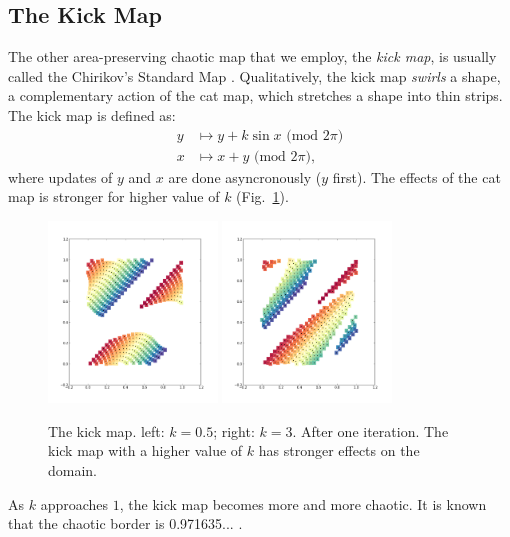 \documentclass[12pt]{reedmcm}
\begin{document}
\subsection{The Kick Map}
The other area-preserving chaotic map that we employ, the \textit{kick map}, is usually called the Chirikov's Standard Map \citep{ott}.
Qualitatively, the kick map \textit{swirls} a shape, a complementary action of the cat map, which stretches a shape into thin strips.
The kick map is defined as:
\begin{align*}
  y &\mapsto y + k \sin x \mbox{ (mod $2\pi$)} \\
  x &\mapsto x + y \mbox{ (mod $2\pi$)},
\end{align*}
where updates of $y$ and $x$ are done asyncronously ($y$ first).
The effects of the cat map is stronger for higher value of $k$ (Fig.~\ref{fig:kickmap_demo1}).
%
\begin{figure}[t]
  \centering
  \includegraphics[width=0.4\textwidth]{kickmap_05}
  \hspace{2cm}
  \includegraphics[width=0.4\textwidth]{kickmap_3}
  \caption{The kick map. left: $k=0.5$; right: $k = 3$. After one iteration. 
    The kick map with a higher value of $k$ has stronger effects on the domain.
  }
  \label{fig:kickmap_demo1}
\end{figure}
%
As $k$ approaches $1$, the kick map becomes more and more chaotic.
It is known that the chaotic border is 0.971635... \citep{spedia}.
\end{document}
